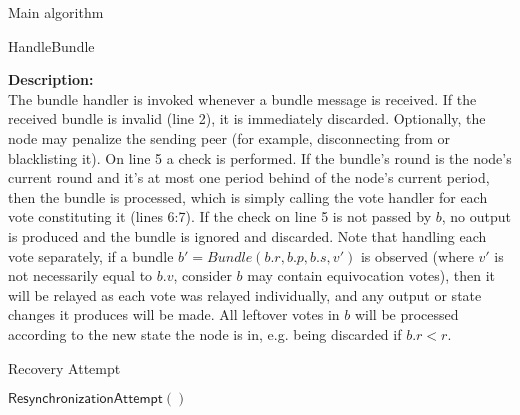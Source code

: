 \documentclass[10pt,a4paper]{article}
\begin{document}
\begin{section}{Main algorithm}
\begin{subsection}{HandleBundle}
\begin{algorithm}[H]
\begin{algorithmic}[1]

        \EndFunction
        \end{algorithmic}
    \end{algorithm}
    
    
    \noindent \textbf{Description:}\\
The bundle handler is invoked whenever a bundle message is received. 
If the received bundle is invalid (line 2), it is immediately discarded. Optionally, the node may
penalize the sending peer (for example, disconnecting from or blacklisting it).
On line 5 a check is performed. 
If the bundle's round is the node's current round and it's at most one period behind of the node's current period, 
then the bundle is processed, which is simply calling the vote handler for each 
vote constituting it (lines 6:7). If the check on line 5 is not passed by $b$, no output is produced
and the bundle is ignored and discarded.
Note that handling each vote separately, if a bundle $b\prime = Bundle(b.r, b.p, b.s, v\prime)$ is observed
(where $v\prime$ is not necessarily equal to $b.v$, consider $b$ may contain equivocation votes), then it will be relayed
as each vote was relayed individually, and any output or state changes it produces will be made. All leftover votes 
in $b$ will be processed according to the new state the node is in, e.g. being discarded if $b.r < r$.
    
\end{subsection}


\begin{subsection}{Recovery Attempt}
    \label{ssect:Recovery}

    \begin{algorithm}[H]
        \caption{\underline{Recovery}}
        \label{algo:recovery}
        \begin{algorithmic}[1]

        \State $\mathsf{ResynchronizationAttempt}()$
    

\end{algorithmic}
\end{algorithm}
\end{subsection}
\end{section}
\end{document}
